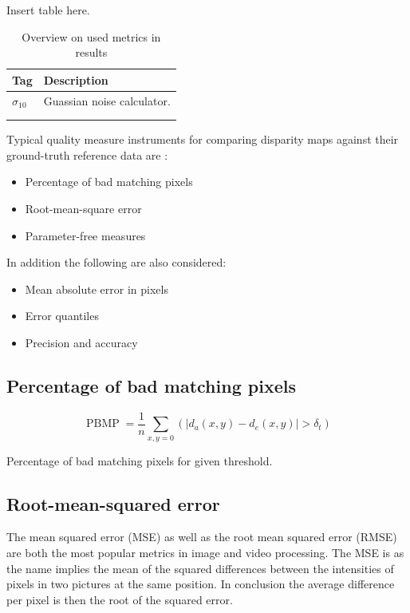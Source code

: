 Insert table here.

\begin{table}[h!]
\centering
\begin{tabular}{l|l}
\textbf{Tag} & \textbf{Description} \\ \hline
$\sigma_{10}$ & Guassian noise calculator. \\ \hline
 &  \\ \hline
 &  \\
\end{tabular}
\caption{Overview on used metrics in results}
\label{tab:metrics}
\end{table}

\noindent Typical quality measure instruments for comparing disparity maps against their ground-truth reference data are  \citep{cyganek2011introduction}:

\begin{itemize}
  \item Percentage of bad matching pixels
  \item Root-mean-square error
  \item Parameter-free measures
\end{itemize}

In addition the following are also considered:

\begin{itemize}
  \item Mean absolute error in pixels
  \item Error quantiles
  \item Precision and accuracy
\end{itemize}

\subsection*{Percentage of bad matching pixels}

\begin{equation}
  \operatorname{PBMP}=\frac{1}{n} \sum_{x,y=0}^{}(|d_a(x,y) - d_e(x,y)| > \delta_t)
\end{equation}

Percentage of bad matching pixels for given threshold.

\subsection*{Root-mean-squared error}

The mean squared error (MSE) as well as the root mean squared error (RMSE) are both the most popular metrics in image and video processing.
The MSE is as the name implies the mean of the squared differences between the intensities of pixels in two pictures at the same position.
In conclusion the average difference per pixel is then the root of the squared error.

